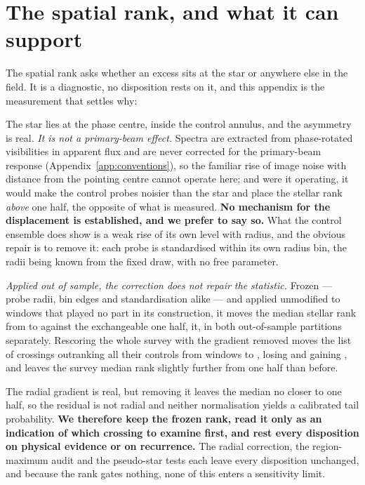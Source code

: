 \section{The spatial rank, and what it can support}
\label{app:radius}

The spatial rank asks whether an excess sits at the star or anywhere else in
the field. It is a diagnostic, no disposition rests on it, and this appendix
is the measurement that settles why: \rankstatus{}

The star lies at the phase centre, inside the control annulus, and the
asymmetry is real. \emph{It is not a primary-beam effect.} Spectra are
extracted from phase-rotated visibilities in apparent flux and are never
corrected for the primary-beam response (Appendix~\ref{app:conventions}), so
the familiar rise of image noise with distance from the pointing centre
cannot operate here; and were it operating, it would make the control probes
noisier than the star and place the stellar rank \emph{above} one half, the
opposite of what is measured. \textbf{No mechanism for the displacement is
established, and we prefer to say so.} What the control ensemble does show is
a weak rise of its own level with radius, and the obvious repair is to remove
it: each probe is standardised within its own radius bin, the radii being
known from the fixed draw, with no free parameter.

\emph{Applied out of sample, the correction does not repair the statistic.}
Frozen --- probe radii, bin edges and standardisation alike --- and applied
unmodified to \RadValStarN{} windows that played no part in its construction,
it moves the median stellar rank from \RadValStarRawMed{} to
\RadValStarCorMed{} against the exchangeable one half, \RadValStarToward{}
it, in both out-of-sample partitions separately. Rescoring the whole survey
with the gradient removed moves the list of crossings outranking all their
controls from \LocStageGlobal{} windows to \LocStageLocal, losing
\LocStageLost{} and gaining \LocStageGained, and leaves the survey median
rank slightly further from one half than before.

The radial gradient is real, but removing it leaves the median no closer to
one half, so the residual is not radial and neither normalisation yields a
calibrated tail probability. \textbf{We therefore keep the frozen rank, read
it only as an indication of which crossing to examine first, and rest every
disposition on physical evidence or on recurrence.} The radial correction, the
region-maximum audit and the pseudo-star tests each leave every disposition
unchanged, and because the rank gates nothing, none of this enters a
sensitivity limit.


